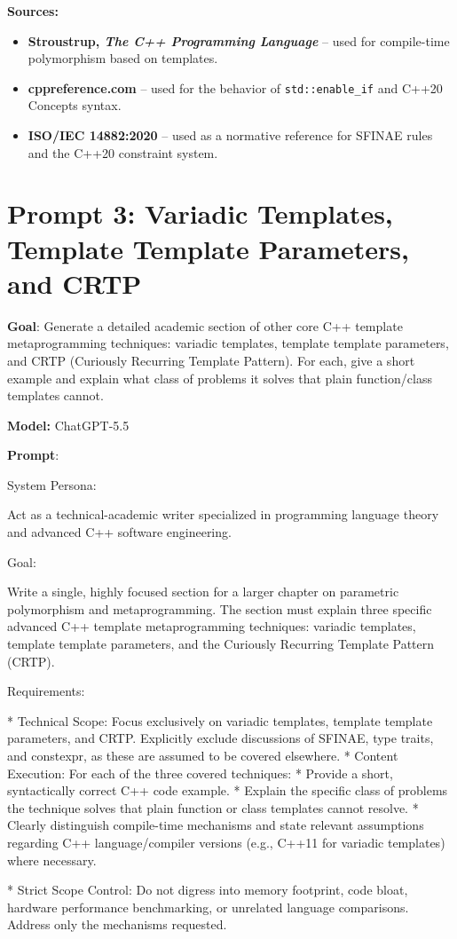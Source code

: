 \documentclass[11pt]{report}
\begin{document}
\noindent\textbf{Sources:}
\begin{itemize}
    \item \textbf{Stroustrup, \emph{The C++ Programming Language}} \cite{stroustrup2013} -- used for compile-time polymorphism based on templates.
    \item \textbf{cppreference.com} \cite{cppreference} -- used for the behavior of \texttt{std::enable\_if} and C++20 Concepts syntax.
    \item \textbf{ISO/IEC 14882:2020} \cite{iso14882} -- used as a normative reference for SFINAE rules and the C++20 constraint system.
\end{itemize}

\section{Prompt 3: Variadic Templates, Template Template Parameters, and CRTP}

\noindent\textbf{Goal}: Generate a detailed academic section of other core C++ template metaprogramming techniques: variadic templates, template template parameters, and CRTP (Curiously Recurring Template Pattern). For each, give a short example and explain what class of problems it solves that plain function/class templates cannot.

\noindent\textbf{Model:} ChatGPT-5.5

\noindent\textbf{Prompt}:
\begin{PromptVerbatim}
System Persona:

Act as a technical-academic writer specialized in programming language theory and advanced C++ software engineering.

Goal:

Write a single, highly focused section for a larger chapter on parametric polymorphism and metaprogramming. The section must explain three specific advanced C++ template metaprogramming techniques: variadic templates, template template parameters, and the Curiously Recurring Template Pattern (CRTP).

Requirements:

* Technical Scope: Focus exclusively on variadic templates, template template parameters, and CRTP. Explicitly exclude discussions of SFINAE, type traits, and constexpr, as these are assumed to be covered elsewhere.
* Content Execution: For each of the three covered techniques:
* Provide a short, syntactically correct C++ code example.
* Explain the specific class of problems the technique solves that plain function or class templates cannot resolve.
* Clearly distinguish compile-time mechanisms and state relevant assumptions regarding C++ language/compiler versions (e.g., C++11 for variadic templates) where necessary.

* Strict Scope Control: Do not digress into memory footprint, code bloat, hardware performance benchmarking, or unrelated language comparisons. Address only the mechanisms requested.
\end{PromptVerbatim}
\end{document}
